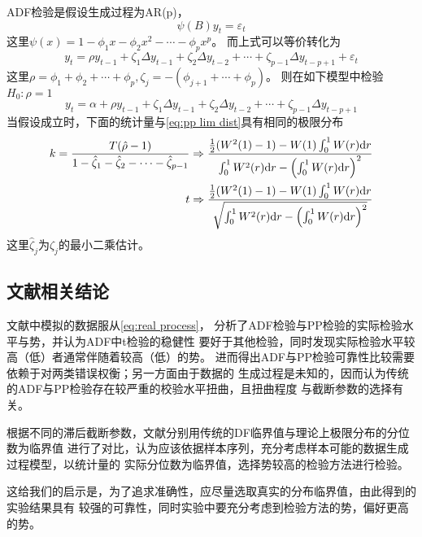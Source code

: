\documentclass[cn]{homework}
\begin{document}
    ADF检验是假设生成过程为AR(p)，
    \[\psi(B)y_t=\varepsilon_t\]
    这里$\psi(x)=1-\phi_1 x-\phi_2 x^2-\cdots-\phi_p x^p$。
    而上式可以等价转化为
    \[y_t=\rho y_{t-1}+\zeta_1\Delta y_{t-1}+\zeta_2\Delta y_{t-2}
    +\cdots+\zeta_{p-1}\Delta y_{t-p+1}+\varepsilon_t\]
    这里$\rho=\phi_1+\phi_2+\cdots+\phi_p,\zeta_j=-(\phi_{j+1}+\cdots+\phi_p)$。
    则在如下模型中检验$H_0:\rho=1$
    \[y_t=\alpha+\rho y_{t-1}+\zeta_1\Delta y_{t-1}+\zeta_2\Delta y_{t-2}
    +\cdots+\zeta_{p-1}\Delta y_{t-p+1}\]
    当假设成立时，下面的统计量与\cref{eq:pp lim dist}具有相同的极限分布
    \[\begin{aligned}
        k=\frac{T(\hat\rho-1)}{1-\hat\zeta_1-\hat\zeta_2-\cdots-\hat\zeta_{p-1}}
        \Rightarrow
        \frac{\frac{1}{2}(W^2(1)-1)-W(1)\int_0^1W(r)\diff r}%
        {\int_0^1W^2(r)\diff r-\left(\int_0^1W(r)\diff r\right)^2}\\
        t\Rightarrow
        \frac{\frac{1}{2}(W^2(1)-1)-W(1)\int_0^1W(r)\diff r}%
        {\sqrt{\int_0^1W^2(r)\diff r-\left(\int_0^1W(r)\diff r\right)^2}}
    \end{aligned}\]
    这里$\hat\zeta_j$为$\zeta_j$的最小二乘估计。

    \subsection{文献相关结论}

    文献中模拟的数据服从\cref{eq:real process}，
    分析了ADF检验与PP检验的实际检验水平与势，并认为ADF中t检验的稳健性
    要好于其他检验，同时发现实际检验水平较高（低）者通常伴随着较高（低）的势。
    进而得出ADF与PP检验可靠性比较需要依赖于对两类错误权衡；另一方面由于数据的
    生成过程是未知的，因而认为传统的ADF与PP检验存在较严重的校验水平扭曲，且扭曲程度
    与截断参数的选择有关。

    根据不同的滞后截断参数，文献分别用传统的DF临界值与理论上极限分布的分位数为临界值
    进行了对比，认为应该依据样本序列，充分考虑样本可能的数据生成过程模型，以统计量的
    实际分位数为临界值，选择势较高的检验方法进行检验。

    这给我们的启示是，为了追求准确性，应尽量选取真实的分布临界值，由此得到的实验结果具有
    较强的可靠性，同时实验中要充分考虑到检验方法的势，偏好更高的势。
\end{document}
